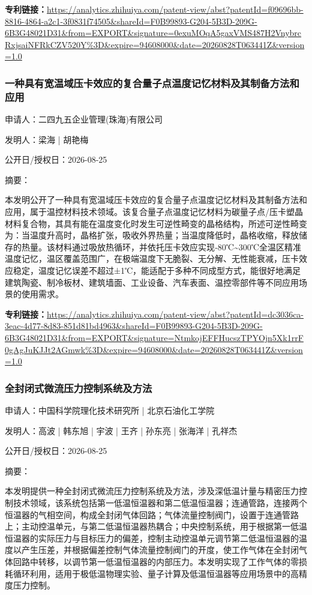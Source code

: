 \documentclass[12pt,a4paper]{ctexart}
\begin{document}
\noindent\textbf{专利链接：}\url{https://analytics.zhihuiya.com/patent-view/abst?patentId=f09696bb-8816-4864-a2c1-3f0831f74505&shareId=F0B99893-G204-5B3D-209G-6B3G48021D31&from=EXPORT&signature=0exuMOqA5gaxVMS487H2VnybrcRxjsaiNFRkCZV520Y%3D&expire=94608000&date=20260828T063441Z&version=1.0}

\subsubsection{ 一种具有宽温域压卡效应的复合量子点温度记忆材料及其制备方法和应用 }

申请人：二四九五企业管理(珠海)有限公司

发明人：梁海 | 胡艳梅

公开日/授权日：2026-08-25

摘要：

本发明公开了一种具有宽温域压卡效应的复合量子点温度记忆材料及其制备方法和应用，属于温控材料技术领域。该复合量子点温度记忆材料为碳量子点/压卡塑晶材料复合物，其具有能在温度变化时发生可逆性畸变的晶格结构，所述可逆性畸变为：当温度升高时，晶格扩张，吸收外界热量；当温度降低时，晶格收缩，释放储存的热量。该材料通过吸放热循环，并依托压卡效应实现‑80℃\textasciitilde{}300℃全温区精准温度记忆，温区覆盖范围广，在极端温度下无脆裂、无分解、无性能衰减，压卡效应稳定，温度记忆误差不超过±1℃，能适配于多种不同成型方式，能很好地满足建筑陶瓷、制冷板材、建筑墙面、工业设备、汽车表面、温控零部件等不同应用场景的使用需求。

\noindent\textbf{专利链接：}\url{https://analytics.zhihuiya.com/patent-view/abst?patentId=dc3036ca-3eac-4d77-8d83-851d81bd4963&shareId=F0B99893-G204-5B3D-209G-6B3G48021D31&from=EXPORT&signature=NtmkojEFFHucszTPYOjn5Xk1rrF0gAgJuKJJt2AGmwk%3D&expire=94608000&date=20260828T063441Z&version=1.0}

\subsubsection{ 全封闭式微流压力控制系统及方法 }

申请人：中国科学院理化技术研究所 | 北京石油化工学院

发明人：高波 | 韩东旭 | 宇波 | 王齐 | 孙东亮 | 张海洋 | 孔祥杰

公开日/授权日：2026-08-25

摘要：

本发明提供一种全封闭式微流压力控制系统及方法，涉及深低温计量与精密压力控制技术领域，该系统包括第一低温恒温器和第二低温恒温器；连通管路，连接两个恒温器的气相空间，构成全封闭气体回路；气体流量控制阀门，设置于连通管路上；主动控温单元，与第二低温恒温器热耦合；中央控制系统，用于根据第一低温恒温器的实际压力与目标压力的偏差，控制主动控温单元调节第二低温恒温器的温度以产生压差，并根据偏差控制气体流量控制阀门的开度，使工作气体在全封闭气体回路中转移，以调节第一低温恒温器的内部压力。本发明实现了工作气体的零损耗循环利用，适用于极低温物理实验、量子计算及低温恒温器等应用场景中的高精度压力控制。
\end{document}
